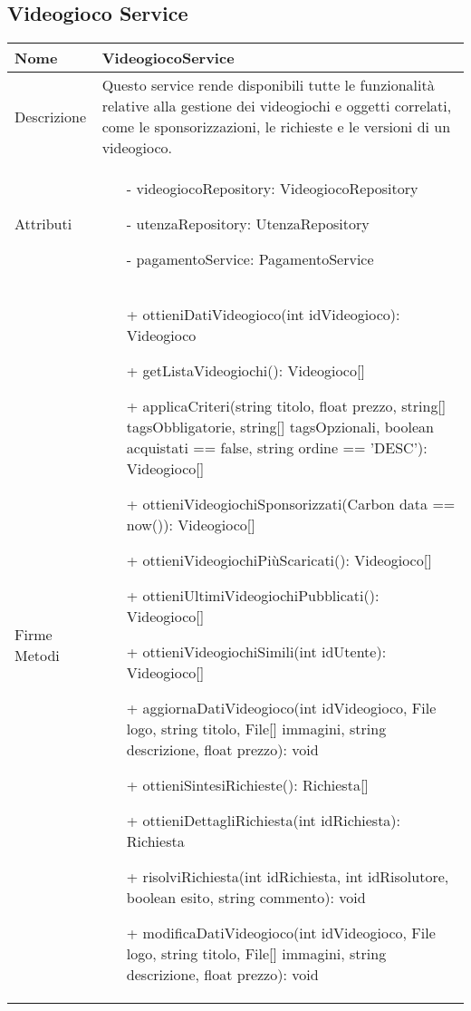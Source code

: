 \newpage
\subsection{Videogioco Service}
\small\begin{tabular}{|| l | p{28em} ||} 
	\hline
	Nome & VideogiocoService\\
	\hline
	Descrizione & Questo service rende disponibili tutte le funzionalità relative alla gestione dei videogiochi e oggetti correlati, come le sponsorizzazioni, le richieste e le versioni di un videogioco. \\
	\hline
	Attributi & \begin{itemize}
		\item[-] videogiocoRepository: VideogiocoRepository
		\item[-] utenzaRepository: UtenzaRepository
		\item[-] pagamentoService: PagamentoService 
	\end{itemize}\\
	\hline
	Firme Metodi & \begin{itemize}
		\item[+] ottieniDatiVideogioco(int idVideogioco): Videogioco
		\item[+] getListaVideogiochi(): Videogioco[]
		\item[+] applicaCriteri(string titolo, float prezzo, string[] tagsObbligatorie, string[] tagsOpzionali, boolean acquistati == false, string ordine == 'DESC'): Videogioco[]
		\item[+] ottieniVideogiochiSponsorizzati(Carbon data == now()): Videogioco[]
		\item[+] ottieniVideogiochiPiùScaricati(): Videogioco[]
		\item[+] ottieniUltimiVideogiochiPubblicati(): Videogioco[]
		\item[+] ottieniVideogiochiSimili(int idUtente): Videogioco[]
		\item[+] aggiornaDatiVideogioco(int idVideogioco, File logo, string titolo, File[] immagini, string descrizione, float prezzo): void
		\item[+] ottieniSintesiRichieste(): Richiesta[]
		\item[+] ottieniDettagliRichiesta(int idRichiesta): Richiesta
		\item[+] risolviRichiesta(int idRichiesta, int idRisolutore, boolean esito, string commento): void
		\item[+] modificaDatiVideogioco(int idVideogioco, File logo, string titolo, File[] immagini, string descrizione, float prezzo): void

\end{itemize}
\end{tabular}
